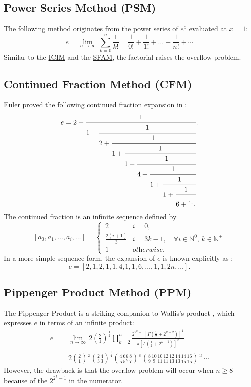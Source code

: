 \documentclass[11pt]{article}
\begin{document}
\subsection{Power Series Method (PSM)}\label{2.6}
The following method originates from the power series of $e^x$ evaluated at $x=1$:
\begin{equation}
e=\lim_{n\to\infty}\,\sum_{k=0}^{n} \frac{1}{k!} = \frac{1}{0!}+\frac{1}{1!}+\dots+\frac{1}{n!}+\cdots
\end{equation}
Similar to the \hyperref[2.2]{ICIM} and the \hyperref[2.5]{SFAM}, the factorial raises the overflow problem.

\subsection{Continued Fraction Method (CFM)}\label{2.7}
Euler proved the following continued fraction expansion in \cite{ar:euler}:
\begin{equation}
e=2+\cfrac{1}{1+\cfrac{1}{2+\cfrac{1}{ 1+\cfrac{1}{1+\cfrac{1}{4+\cfrac{1}{1+\cfrac{1}{1+\cfrac{1}{6+\ddots}}}}}}}}.
\end{equation}
The continued fraction is an infinite sequence \cite{bk:finch} defined by
\[
[a_0, a_1,\dots,a_i,\dots]=
\begin{cases}
\,2                & i=0,\\
\,\frac{2(i+1)}{3} & i=3k-1, \quad \forall i\in\mathbb{N}^{0},\, k\in\mathbb{N}^{+}\\ 
\,1                & \textit{otherwise}.
\end{cases}
\]
In a more simple sequence form, the expansion of $e$ is known explicitly as \cite{bk:eymard_lafon}:
\[
e=[2, 1, 2, 1, 1, 4, 1, 1, 6, \dots, 1, 1, 2n, \dots].
\]

\subsection{Pippenger Product Method (PPM)}\label{2.8}
The Pippenger Product is a striking companion to Wallis's product \cite{ar:pippenger}, which expresses $e$ in terms of an infinite product:
\begin{equation}
\begin{split}
e&=\lim_{n\to\infty}\,2\left(\frac{2}{1}\right)^{\frac{1}{2}}\prod_{k=2}^{n} \frac{2^{2^{k}-1}\left[\Gamma\left(\frac{1}{2}+2^{k-2}\right)\right]^{4}}{\pi\left[\Gamma\left(\frac{1}{2}+2^{k-1}\right)\right]^{2}}\\
&=2\left(\frac{2}{1}\right)^{\frac{1}{2}}\left(\frac{2}{3}\frac{4}{3}\right)^{\frac{1}{4}}\left(\frac{4}{5}\frac{6}{5}\frac{6}{7}\frac{8}{7}\right)^{\frac{1}{8}}\left(\frac{8}{9}\frac{10}{9}\frac{10}{11}\frac{12}{11}\frac{12}{13}\frac{14}{13}\frac{14}{15}\frac{16}{15}\right)^{\frac{1}{16}}\cdots
\end{split}
\end{equation}
However, the drawback is that the overflow problem will occur when $n\geq 8$ because of the $2^{2^{k}-1}$ in the numerator.
\end{document}
